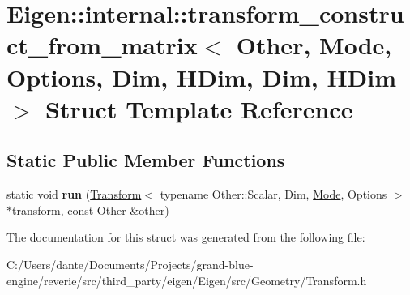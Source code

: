 \hypertarget{struct_eigen_1_1internal_1_1transform__construct__from__matrix_3_01_other_00_01_mode_00_01_optio2861b11cb783feb790ab70300c43bf0a}{}\section{Eigen\+::internal\+::transform\+\_\+construct\+\_\+from\+\_\+matrix$<$ Other, Mode, Options, Dim, H\+Dim, Dim, H\+Dim $>$ Struct Template Reference}
\label{struct_eigen_1_1internal_1_1transform__construct__from__matrix_3_01_other_00_01_mode_00_01_optio2861b11cb783feb790ab70300c43bf0a}
\subsection*{Static Public Member Functions}
\begin{DoxyCompactItemize}
\item 
\mbox{\label{struct_eigen_1_1internal_1_1transform__construct__from__matrix_3_01_other_00_01_mode_00_01_optio2861b11cb783feb790ab70300c43bf0a_a57c65cb53061fa3f5192bea43e7a79a6}} 
static void {\bfseries run} (\mbox{\hyperlink{class_eigen_1_1_transform}{Transform}}$<$ typename Other\+::\+Scalar, Dim, \mbox{\hyperlink{struct_mode}{Mode}}, Options $>$ $\ast$transform, const Other \&other)
\end{DoxyCompactItemize}


The documentation for this struct was generated from the following file\+:\begin{DoxyCompactItemize}
\item 
C\+:/\+Users/dante/\+Documents/\+Projects/grand-\/blue-\/engine/reverie/src/third\+\_\+party/eigen/\+Eigen/src/\+Geometry/Transform.\+h\end{DoxyCompactItemize}
